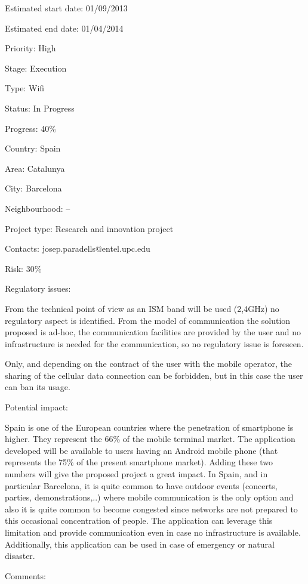\documentclass[draftclsnofoot,12pt,journal,onecolumn]{IEEEtran}
\begin{document}
Estimated start date: 01/09/2013

Estimated end date: 01/04/2014

Priority: High

Stage: Execution

Type: Wifi

Status: In Progress

Progress: 40\%

Country: Spain

Area: Catalunya

City: Barcelona

Neighbourhood: --

Project type: Research and innovation project

Contacts: josep.paradells@entel.upc.edu

Risk: 30\%

Regulatory issues:

 From the technical point of view as an ISM band will be used (2,4GHz) no
regulatory aspect is identified. From the model of communication the solution
proposed is ad-hoc, the communication facilities are provided by the user and
no infrastructure is needed for the communication, so no regulatory issue is
foreseen.

Only, and depending on the contract of the user with the mobile operator, the
sharing of the cellular data connection can be forbidden, but in this case
the user can ban its usage.

Potential impact:

Spain is one of the European countries where the penetration of smartphone is
higher. They represent the 66\% of the mobile terminal market. The application
developed will be available to users having an Android mobile phone (that
represents the 75\% of the present smartphone market). Adding these two
numbers will give the proposed project a great impact. In Spain, and in
particular Barcelona, it is quite common to have outdoor events (concerts,
parties, demonstrations,..) where mobile communication is the only option and
also it is quite common to become congested since networks are not prepared
to this occasional concentration of people.
The application can leverage this limitation and provide communication even
in case no infrastructure is available. Additionally, this application can be
used in case of emergency or natural disaster.

Comments:
\end{document}
